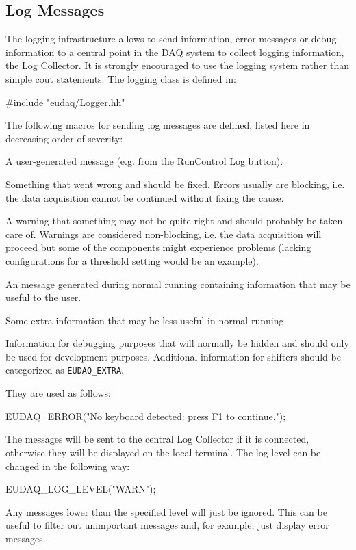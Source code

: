 \subsection{Log Messages}
The logging infrastructure allows to send information, error messages or debug information to a central point in the DAQ system to collect logging information, the Log Collector.
It is strongly encouraged to use the logging system rather than simple cout statements.
The logging class is defined in:
\begin{listing}
#include "eudaq/Logger.hh"
\end{listing}

The following macros for sending log messages are defined,
listed here in decreasing order of severity:
\begin{description}

A user-generated message (e.g. from the RunControl Log button).

Something that went wrong and should be fixed. Errors usually are blocking, i.e. the data acquisition cannot be continued without fixing the cause.

A warning that something may not be quite right and should probably be taken care of. Warnings are considered non-blocking, i.e. the data acquisition will proceed but some of the components might experience problems (lacking configurations for a threshold setting would be an example).

An message generated during normal running containing information that may be useful to the user.

Some extra information that may be less useful in normal running.

Information for debugging purposes that will normally be hidden and should only be used for development purposes. Additional information for shifters should be categorized as \texttt{EUDAQ\_EXTRA}.

\end{description}

They are used as follows:
\begin{listing}
EUDAQ_ERROR("No keyboard detected: press F1 to continue.");
\end{listing}

The messages will be sent to the central Log Collector if it is connected,
otherwise they will be displayed on the local terminal.
The log level can be changed in the following way:
\begin{listing}
EUDAQ_LOG_LEVEL("WARN");
\end{listing}

Any messages lower than the specified level will just be ignored.
This can be useful to filter out unimportant messages and, for example, just display error messages.
